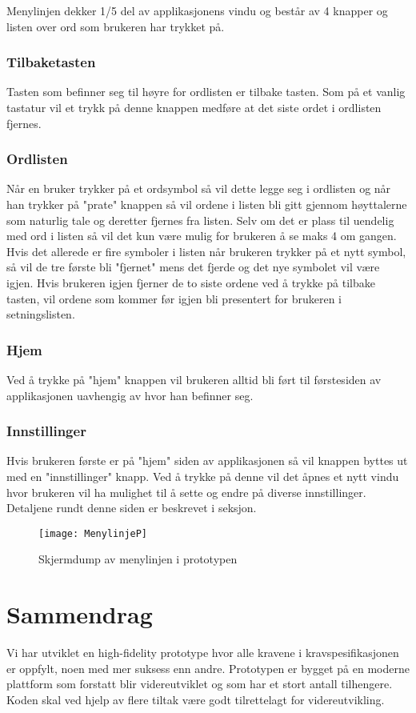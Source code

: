 Menylinjen dekker 1/5 del av applikasjonens vindu og består av 4 knapper og listen over ord som brukeren har trykket på. 
 
\subsubsection{Tilbaketasten} 
 
Tasten som befinner seg til høyre for ordlisten er tilbake tasten. Som på et vanlig tastatur vil et trykk på denne knappen medføre at det siste ordet i ordlisten fjernes. 
 
\subsubsection{Ordlisten} 
 
Når en bruker trykker på et ordsymbol så vil dette legge seg i ordlisten og når han trykker på "prate" knappen så vil ordene i listen bli gitt gjennom høyttalerne som naturlig tale og deretter fjernes fra listen. Selv om det er plass til uendelig med ord i listen så vil det kun være mulig for brukeren å se maks 4 om gangen. Hvis det allerede er fire symboler i listen når brukeren trykker på et nytt symbol, så vil de tre første bli "fjernet" mens det fjerde og det nye symbolet vil være igjen. Hvis brukeren igjen fjerner de to siste ordene ved å trykke på tilbake tasten,  vil ordene som kommer før igjen bli presentert for brukeren i setningslisten.  
 
 
\subsubsection{Hjem} 
Ved å trykke på "hjem" knappen vil brukeren alltid bli ført til førstesiden av applikasjonen uavhengig av hvor han befinner seg.  
 
\subsubsection{Innstillinger} 
Hvis brukeren første er på "hjem" siden av applikasjonen så vil knappen byttes ut med en "innstillinger" knapp. Ved å trykke på denne vil det åpnes et nytt vindu hvor brukeren vil ha mulighet til å sette og endre på diverse innstillinger. Detaljene rundt denne siden er beskrevet i seksjon. 
 
 
\begin{figure}[ht!] 
\centering 
\texttt{[image: MenylinjeP]} 
\caption{Skjermdump av menylinjen i prototypen} 
\label{fig:menylinjen} 
\end{figure} 
 



\section{Sammendrag} 

Vi har utviklet en high-fidelity prototype hvor alle kravene i kravspesifikasjonen er oppfylt, noen med mer suksess enn andre. Prototypen er bygget på en moderne plattform som forstatt blir videreutviklet og som har et stort antall tilhengere. Koden skal ved hjelp av flere tiltak være godt tilrettelagt for videreutvikling. 




